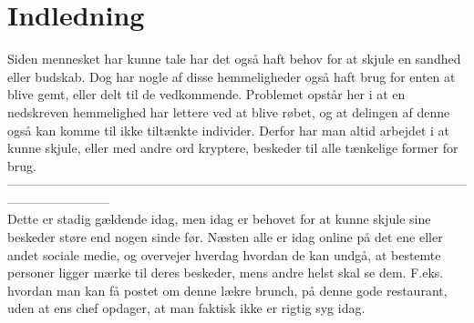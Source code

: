 \section{Indledning}
Siden mennesket har kunne tale har det også haft behov for at skjule en sandhed eller budskab. Dog har nogle af disse hemmeligheder også haft brug for enten at blive gemt, eller delt til de vedkommende. Problemet opstår her i at en nedskreven hemmelighed har lettere ved at blive røbet, og at delingen af denne også kan komme til ikke tiltænkte individer.
Derfor har man altid arbejdet i at kunne skjule, eller med andre ord kryptere, beskeder til alle tænkelige former for brug. \\
\noindent
------------------------------------------------------------------------------------------------------------------------------------\\
\noindent
Dette er stadig gældende idag, men idag er behovet for at kunne skjule sine beskeder støre end nogen sinde før. Næsten alle er idag online på det ene eller andet sociale medie, og overvejer hverdag hvordan de kan undgå, at bestemte personer ligger mærke til deres beskeder, mens andre helst skal se dem. F.eks. hvordan man kan få postet om denne lækre brunch, på denne gode restaurant, uden at ens chef opdager, at man faktisk ikke er rigtig syg idag.

